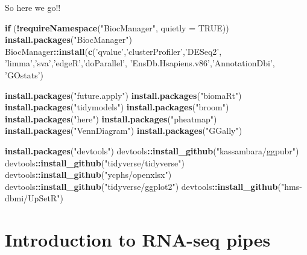 \documentclass[]{book}
\newenvironment{Shaded}{\begin{snugshade}}{\end{snugshade}}
\newcommand{\ControlFlowTok}[1]{\textcolor[rgb]{0.13,0.29,0.53}{\textbf{#1}}}
\newcommand{\DataTypeTok}[1]{\textcolor[rgb]{0.13,0.29,0.53}{#1}}
\newcommand{\KeywordTok}[1]{\textcolor[rgb]{0.13,0.29,0.53}{\textbf{#1}}}
\newcommand{\NormalTok}[1]{#1}
\newcommand{\OperatorTok}[1]{\textcolor[rgb]{0.81,0.36,0.00}{\textbf{#1}}}
\newcommand{\OtherTok}[1]{\textcolor[rgb]{0.56,0.35,0.01}{#1}}
\newcommand{\StringTok}[1]{\textcolor[rgb]{0.31,0.60,0.02}{#1}}
\begin{document}
So here we go!!

\begin{Shaded}
\begin{Highlighting}[]
\ControlFlowTok{if}\NormalTok{ (}\OperatorTok{!}\KeywordTok{requireNamespace}\NormalTok{(}\StringTok{"BiocManager"}\NormalTok{, }\DataTypeTok{quietly =} \OtherTok{TRUE}\NormalTok{))}
    \KeywordTok{install.packages}\NormalTok{(}\StringTok{"BiocManager"}\NormalTok{)}
\NormalTok{BiocManager}\OperatorTok{::}\KeywordTok{install}\NormalTok{(}\KeywordTok{c}\NormalTok{(}\StringTok{'qvalue'}\NormalTok{,}\StringTok{'clusterProfiler'}\NormalTok{,}\StringTok{'DESeq2'}\NormalTok{,}
                       \StringTok{'limma'}\NormalTok{,}\StringTok{'sva'}\NormalTok{,}\StringTok{'edgeR'}\NormalTok{,}\StringTok{'doParallel'}\NormalTok{,}
                       \StringTok{'EnsDb.Hsapiens.v86'}\NormalTok{,}\StringTok{'AnnotationDbi'}\NormalTok{,}
                       \StringTok{'GOstats'}\NormalTok{)}
                     
\KeywordTok{install.packages}\NormalTok{(}\StringTok{"future.apply"}\NormalTok{)}
\KeywordTok{install.packages}\NormalTok{(}\StringTok{"biomaRt"}\NormalTok{)}
\KeywordTok{install.packages}\NormalTok{(}\StringTok{"tidymodels"}\NormalTok{)}
\KeywordTok{install.packages}\NormalTok{(}\StringTok{"broom"}\NormalTok{)}
\KeywordTok{install.packages}\NormalTok{(}\StringTok{"here"}\NormalTok{)}
\KeywordTok{install.packages}\NormalTok{(}\StringTok{"pheatmap"}\NormalTok{)}
\KeywordTok{install.packages}\NormalTok{(}\StringTok{"VennDiagram"}\NormalTok{)}
\KeywordTok{install.packages}\NormalTok{(}\StringTok{"GGally"}\NormalTok{)}

\KeywordTok{install.packages}\NormalTok{(}\StringTok{"devtools"}\NormalTok{)}
\NormalTok{devtools}\OperatorTok{::}\KeywordTok{install_github}\NormalTok{(}\StringTok{"kassambara/ggpubr"}\NormalTok{)}
\NormalTok{devtools}\OperatorTok{::}\KeywordTok{install_github}\NormalTok{(}\StringTok{"tidyverse/tidyverse"}\NormalTok{)}
\NormalTok{devtools}\OperatorTok{::}\KeywordTok{install_github}\NormalTok{(}\StringTok{"ycphs/openxlsx"}\NormalTok{)}
\NormalTok{devtools}\OperatorTok{::}\KeywordTok{install_github}\NormalTok{(}\StringTok{"tidyverse/ggplot2"}\NormalTok{)}
\NormalTok{devtools}\OperatorTok{::}\KeywordTok{install_github}\NormalTok{(}\StringTok{"hms-dbmi/UpSetR"}\NormalTok{)}
\end{Highlighting}
\end{Shaded}

\hypertarget{introPipes}{%
\chapter{Introduction to RNA-seq pipes}\label{introPipes}}
\end{document}
